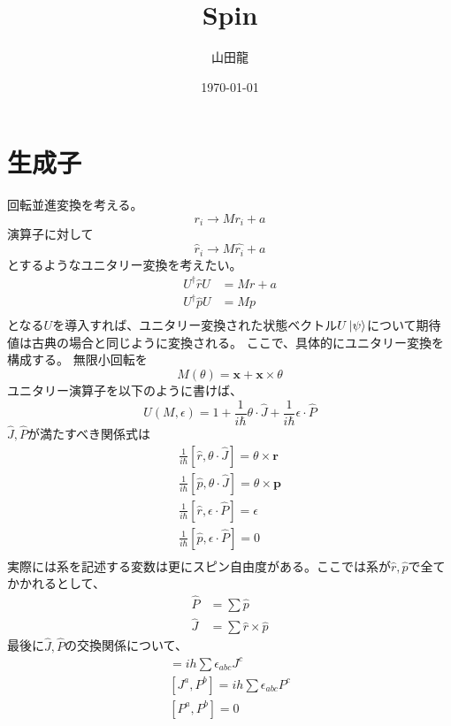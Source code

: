 \documentclass{jsarticle}
\date{\today}
\author{山田龍}
\title{Spin}
\newcommand{\beq}{\begin{equation}}
\newcommand{\eeq}{\end{equation}}
\newcommand{\hr}{\hat{r}}
\newcommand{\hp}{\hat{p}}
\newcommand{\hcj}{\hat{J}}
\newcommand{\hcp}{\hat{P}}
\newcommand{\rh}{\frac{1}{i\hbar}}
\begin{document}
\maketitle
\section{生成子}
回転並進変換を考える。
\beq
    r_i \rightarrow M r_i + a
\eeq
演算子に対して
\beq
\hat{r}_i \rightarrow M \hat{r_i} + a
\eeq
とするようなユニタリー変換を考えたい。
\begin{align}
    U^\dagger \hr U &= M r + a\\
    U^\dagger \hp U &= Mp\\
\end{align}
となる$U$を導入すれば、ユニタリー変換された状態ベクトル$U\Ket{\psi}$について期待値は古典の場合と同じように変換される。
ここで、具体的にユニタリー変換を構成する。
無限小回転を
\beq
M(\theta) = \bm{x} + \bm{x}  \times \theta
\eeq
ユニタリー演算子を以下のように書けば、
\beq
U(M, \epsilon) = 1 + \rh \theta \cdot \hat{J} + \rh \epsilon \cdot \hat{P}
\eeq
$\hcj ,\hcp$が満たすべき関係式は
\begin{align}
    \rh [\hr ,\theta \cdot \hat{J}] = \theta \times \bm{r}\\
    \rh [\hp ,\theta \cdot \hat{J}] = \theta \times \bm{p}\\
\rh [\hr ,\epsilon \cdot \hcp] = \epsilon\\
\rh [\hp ,\epsilon \cdot \hcp] = 0\\
\end{align}
実際には系を記述する変数は更にスピン自由度がある。ここでは系が$\hr ,\hp$で全てかかれるとして、
\begin{align}
    \hcp &= \sum \hp\\
    \hcj &= \sum \hr \times \hp
\end{align}
最後に$\hcj ,\hcp$の交換関係について、
\begin{align}
    [J^a,J^b] = ih \sum \epsilon_{abc}J^c\\
[J^a,P^b] = ih \sum \epsilon_{abc}P^c\\
[P^a,P^b] = 0
\end{align}
\end{document}
